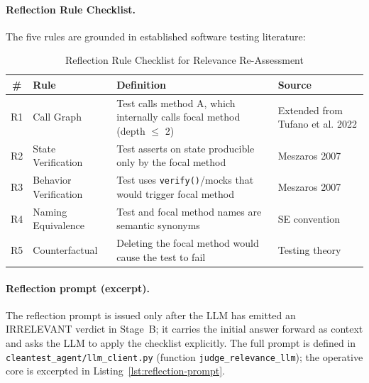 \documentclass[acmlarge,nonacm,screen]{acmart}
\begin{document}
\paragraph{Reflection Rule Checklist.} The five rules are grounded in established software testing literature:

\begin{table}[htbp]
\caption{Reflection Rule Checklist for Relevance Re-Assessment}
\label{tab:reflection-rules}
\begin{tabular}{@{}clp{5.5cm}l@{}}
\toprule
\textbf{\#} & \textbf{Rule} & \textbf{Definition} & \textbf{Source} \\
\midrule
R1 & Call Graph & Test calls method A, which internally calls focal method (depth $\leq$ 2) & Extended from Tufano et al. 2022 \\
R2 & State Verification & Test asserts on state producible only by the focal method & Meszaros 2007 \\
R3 & Behavior Verification & Test uses \texttt{verify()}/mocks that would trigger focal method & Meszaros 2007 \\
R4 & Naming Equivalence & Test and focal method names are semantic synonyms & SE convention \\
R5 & Counterfactual & Deleting the focal method would cause the test to fail & Testing theory \\
\bottomrule
\end{tabular}
\end{table}

\paragraph{Reflection prompt (excerpt).} The reflection prompt is
issued only after the LLM has emitted an \textsc{IRRELEVANT} verdict
in Stage~B; it carries the initial answer forward as context and
asks the LLM to apply the checklist explicitly. The full prompt is
defined in
\texttt{cleantest\_agent/\allowbreak llm\_client.py} (function
\texttt{judge\_relevance\_llm}); the operative core is excerpted in
Listing~\ref{lst:reflection-prompt}.
\end{document}
